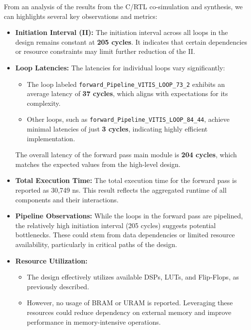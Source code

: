 \documentclass{article}
\begin{document}
From an analysis of the results from the C/RTL co-simulation and synthesis, we can highlights several key observations and metrics:

\begin{itemize}
    \item \textbf{Initiation Interval (II):} The initiation interval across all loops in the design remains constant at \textbf{205 cycles}. It indicates that certain dependencies or resource constraints may limit further reduction of the II.

    \item \textbf{Loop Latencies:} The latencies for individual loops vary significantly:
    \begin{itemize}
        \item The loop labeled \texttt{forward\_Pipeline\_VITIS\_LOOP\_73\_2} exhibits an average latency of \textbf{37 cycles}, which aligns with expectations for its complexity.
        \item Other loops, such as \texttt{forward\_Pipeline\_VITIS\_LOOP\_84\_44}, achieve minimal latencies of just \textbf{3 cycles}, indicating highly efficient implementation.
    \end{itemize}
    The overall latency of the forward pass main module is \textbf{204 cycles}, which matches the expected values from the high-level design.

    \item \textbf{Total Execution Time:} The total execution time for the forward pass is reported as 30,749 ns. This result reflects the aggregated runtime of all components and their interactions.

    \item \textbf{Pipeline Observations:} While the loops in the forward pass are pipelined, the relatively high initiation interval (205 cycles) suggests potential bottlenecks. These could stem from data dependencies or limited resource availability, particularly in critical paths of the design.

    \item \textbf{Resource Utilization:} 
    \begin{itemize}
        \item The design effectively utilizes available DSPs, LUTs, and Flip-Flops, as previously described.
        \item However, no usage of BRAM or URAM is reported. Leveraging these resources could reduce dependency on external memory and improve performance in memory-intensive operations.
    \end{itemize}
\end{itemize}
\end{document}
